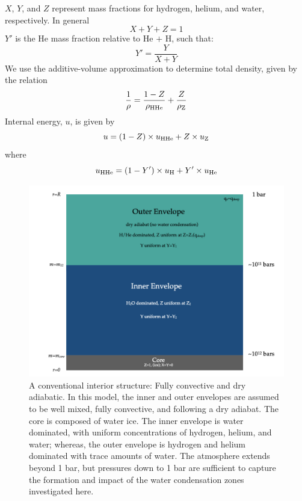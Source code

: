 \documentclass[11pt]{ucscthesisbs}
\begin{document}
$X$, $Y$, and $Z$ represent mass fractions for hydrogen, helium, and water, respectively. In general
\begin{equation}
  X + Y + Z = 1
\end{equation}
$Y'$ is the He mass fraction relative to He $+$ H, such that:
\begin{equation}
  Y' = \frac{Y}{X+Y}
\end{equation}
We use the additive-volume approximation to determine total density, given by the relation
\begin{equation}
  \frac{1}{\rho} = \frac{1-Z}{\rho_{\rm H He}} + \frac{Z}{\rho_{\rm Z}}
\end{equation}
Internal energy, $u$, is given by
\begin{equation}
  u = (1-Z)\times u_{\rm HHe} + Z\times u_{\rm Z}
\end{equation}
where
\begin{equation}
 u_{\rm HHe} = (1-Y')\times u_{\rm H} + Y'\times u_{\rm He}
\end{equation}
\begin{figure}[ht!]
 \centerline{
  \includegraphics[width=6.0in]{figures/structure_schematic/structure_schematic.001.jpeg}
 }
\caption[A Standard Interior Structure Model]
{A conventional interior structure: Fully convective and dry adiabatic. In this model, the inner and outer envelopes are assumed to be well mixed, fully convective, and following a dry adiabat. The core is composed of water ice. The inner envelope is water dominated, with uniform concentrations of hydrogen, helium, and water; whereas, the outer envelope is hydrogen and helium dominated with trace amounts of water. The atmosphere extends beyond 1 bar, but pressures down to 1 bar are sufficient to capture the formation and impact of the water condensation zones investigated here.}
\label{fig:standard_dry_interior}
\end{figure}
\end{document}
